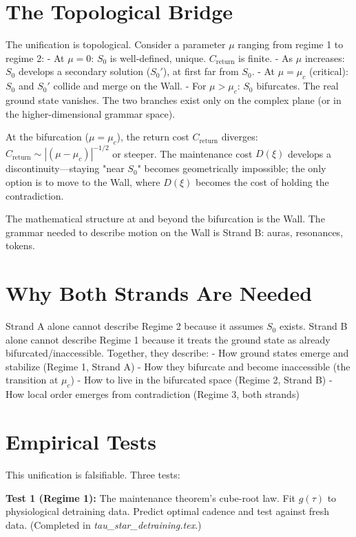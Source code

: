 \documentclass[12pt]{article}
\begin{document}
\section{The Topological Bridge}

The unification is topological. Consider a parameter $\mu$ ranging from regime 1 to regime 2:
- At $\mu = 0$: $S_0$ is well-defined, unique. $C_{\text{return}}$ is finite.
- As $\mu$ increases: $S_0$ develops a secondary solution ($S_0'$), at first far from $S_0$.
- At $\mu = \mu_c$ (critical): $S_0$ and $S_0'$ collide and merge on the Wall.
- For $\mu > \mu_c$: $S_0$ bifurcates. The real ground state vanishes. The two branches exist only on the complex plane (or in the higher-dimensional grammar space).

At the bifurcation ($\mu = \mu_c$), the return cost $C_{\text{return}}$ diverges: $C_{\text{return}} \sim |(\mu - \mu_c)|^{-1/2}$ or steeper. The maintenance cost $D(\xi)$ develops a discontinuity—staying "near $S_0$" becomes geometrically impossible; the only option is to move to the Wall, where $D(\xi)$ becomes the cost of holding the contradiction.

The mathematical structure at and beyond the bifurcation is the Wall. The grammar needed to describe motion on the Wall is Strand B: auras, resonances, tokens.

\section{Why Both Strands Are Needed}

Strand A alone cannot describe Regime 2 because it assumes $S_0$ exists. Strand B alone cannot describe Regime 1 because it treats the ground state as already bifurcated/inaccessible. Together, they describe:
- How ground states emerge and stabilize (Regime 1, Strand A)
- How they bifurcate and become inaccessible (the transition at $\mu_c$)
- How to live in the bifurcated space (Regime 2, Strand B)
- How local order emerges from contradiction (Regime 3, both strands)

\section{Empirical Tests}

This unification is falsifiable. Three tests:

\textbf{Test 1 (Regime 1):} The maintenance theorem's cube-root law. Fit $g(\tau)$ to physiological detraining data. Predict optimal cadence and test against fresh data. (Completed in \textit{tau\_star\_detraining.tex}.)
\end{document}
